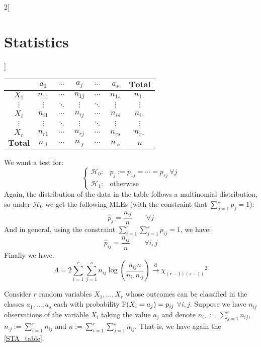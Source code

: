 \documentclass[../../../main_math.tex]{subfiles}
\begin{document}
\begin{multicols}{2}[\section{Statistics}]
\begin{definition}
    \begin{center}
      \begin{minipage}{\linewidth}
        \centering
        \begin{tabular}{c||ccccc|c}
                           & $a_1$         & $\cdots$ & $a_j$         & $\cdots$ & $a_s$         & $\mathbf{Total}$ \\
          \hline\hline
          $X_1$            & $n_{11}$      & $\cdots$ & $n_{1j}$      & $\cdots$ & $n_{1s}$      & $n_{1\cdot}$     \\
          $\vdots$         & $\vdots$      & $\ddots$ & $\vdots$      & $\ddots$ & $\vdots$      & $\vdots$         \\
          $X_i$            & $n_{i1}$      & $\cdots$ & $n_{ij}$      & $\cdots$ & $n_{is}$      & $n_{i\cdot}$     \\
          $\vdots$         & $\vdots$      & $\ddots$ & $\vdots$      & $\ddots$ & $\vdots$      & $\vdots$         \\
          $X_r$            & $n_{r1}$      & $\cdots$ & $n_{rj}$      & $\cdots$ & $n_{rs}$      & $n_{r\cdot}$     \\
          \hline
          $\mathbf{Total}$ & $n_{\cdot 1}$ & $\cdots$ & $n_{\cdot j}$ & $\cdots$ & $n_{\cdot s}$ & $n$
        \end{tabular}
        \label{STA_table}
      \end{minipage}
    \end{center}
    We want a test for:
    $$
      \begin{cases}
        \mathcal{H}_0: & p_j:=p_{1j}=\cdots=p_{rj}\ \forall j \\
        \mathcal{H}_1: & \text{otherwise}
      \end{cases}
    $$
    Again, the distribution of the data in the table follows a multinomial distribution, so under $\mathcal{H}_0$ we get the following MLEs (with the constraint that $\sum_{j=1}^sp_{j}=1$):
    $$\hat{p}_j=\frac{n_{\cdot j}}{n}\qquad\forall j$$
    And in general, using the constraint $\sum_{i=1}^r\sum_{j=1}^sp_{ij}=1$, we have: $$\hat{p}_{ij}=\frac{n_{ij}}{n}\qquad\forall i,j$$
    Finally we have: $$\Lambda=2\sum_{i=1}^r\sum_{j=1}^sn_{ij}\log\left(\frac{n_{ij}n}{n_{i\cdot}n_{\cdot j}}\right)\overset{\text{d}}{\longrightarrow}{\chi_{(r-1)(s-1)}}^2$$
  \end{definition}
  \begin{definition}
    Consider $r$ \iid random variables $X_1,\ldots,X_r$ whose outcomes can be classified in the classes $a_1,\ldots,a_s$ each with probability $\mathbb{P}(X_i=a_j)=p_{ij}$ $\forall i,j$. Suppose we have $n_{ij}$ observations of the variable $X_i$ taking the value $a_j$ and denote $n_{i\cdot}:=\sum_{j=1}^sn_{ij}$, $n_{\cdot j}:=\sum_{i=1}^rn_{ij}$ and $n:=\sum_{i=1}^r\sum_{j=1}^sn_{ij}$. That is, we have again the \cref{STA_table}.

\end{definition}
\end{multicols}
\end{document}
